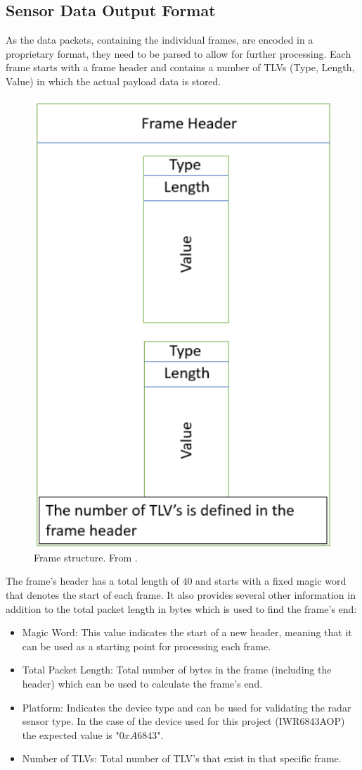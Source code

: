 \subsection{Sensor Data Output Format}
As the data packets, containing the individual frames, are encoded in a proprietary format, they need to be parsed to allow for further processing.
Each frame starts with a frame header and contains a number of TLVs (Type, Length, Value) in which the actual payload data is stored\cite{mmwave_demo_doc}.
\begin{figure}[!htbp]
    \centering
    \includegraphics[width=0.4\linewidth]{images/UARTFrame.png}
    \caption{Frame structure. From \cite{mmwave_demo_output}.}
    \label{fig:UART data output format}
\end{figure}
\FloatBarrier\noindent
The frame's header has a total length of \SI{40}{\byte} and starts with a fixed magic word that denotes the start of each frame.
It also provides several other information in addition to the total packet length in bytes which is used to find the frame's end:
\begin{itemize}
    \item Magic Word: This value indicates the start of a new header, meaning that it can be used as a starting point for processing each frame.
    \item Total Packet Length: Total number of bytes in the frame (including the header) which can be used to calculate the frame's end.
    \item Platform: Indicates the device type and can be used for validating the radar sensor type. In the case of the device used for this project (IWR6843AOP) the expected value is "$0xA6843$".
    \item Number of TLVs: Total number of TLV's that exist in that specific frame.
\end{itemize}
